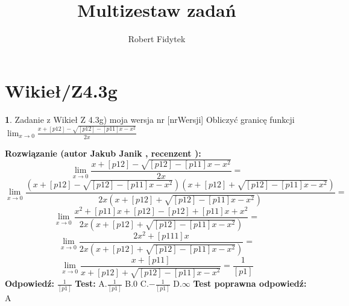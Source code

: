 \documentclass[12pt, a4paper]{article}
\title{Multizestaw zadań}
\author{Robert Fidytek}
\date{}
\theoremstyle{definition} %
\newtheorem{zad}{}
\newcommand{\kategoria}[1]{\section{#1}} %
\newcommand{\zadStart}[1]{\begin{zad}#1\newline} %
\newcommand{\zadStop}{\end{zad}}   %
\newcommand{\rozwStart}[2]{\noindent \textbf{Rozwiązanie (autor #1 , recenzent #2): }\newline} %
\newcommand{\rozwStop}{\newline}                                            %
\newcommand{\odpStart}{\noindent \textbf{Odpowiedź:}\newline}    %
\newcommand{\odpStop}{\newline}                                             %
\newcommand{\testStart}{\noindent \textbf{Test:}\newline} %
\newcommand{\testStop}{\newline} %
\newcommand{\kluczStart}{\noindent \textbf{Test poprawna odpowiedź:}\newline} %
\newcommand{\kluczStop}{\newline} %
\begin{document}
\maketitle


\kategoria{Wikieł/Z4.3g}
\zadStart{Zadanie z Wikieł Z 4.3g) moja wersja nr [nrWersji]}
Obliczyć granicę funkcji $\lim_{x \to 0} \frac{x+[p12]-\sqrt{[p12]-[p11]x-x^2}}{2x}$
\zadStop
\rozwStart{Jakub Janik}{}
$$\lim_{x \to 0} \frac{x+[p12]-\sqrt{[p12]-[p11]x-x^2}}{2x}=$$
$$\lim_{x \to 0} \frac{(x+[p12]-\sqrt{[p12]-[p11]x-x^2})(x+[p12]+\sqrt{[p12]-[p11]x-x^2})}{2x(x+[p12]+\sqrt{[p12]-[p11]x-x^2})}=$$
$$\lim_{x \to 0} \frac{x^2+[p11]x+[p12]-[p12]+[p11]x+x^2}{2x(x+[p12]+\sqrt{[p12]-[p11]x-x^2})}=$$
$$\lim_{x \to 0} \frac{2x^2+[p111]x}{2x(x+[p12]+\sqrt{[p12]-[p11]x-x^2})}=$$
$$\lim_{x \to 0} \frac{x+[p11]}{x+[p12]+\sqrt{[p12]-[p11]x-x^2}}=\frac{1}{[p1]}$$
\rozwStop
\odpStart
$\frac{1}{[p1]}$
\odpStop
\testStart
A.$\frac{1}{[p1]}$
B.$0$
C.$-\frac{1}{[p1]}$
D.$\infty$
\testStop
\kluczStart
A
\kluczStop
\end{document}
